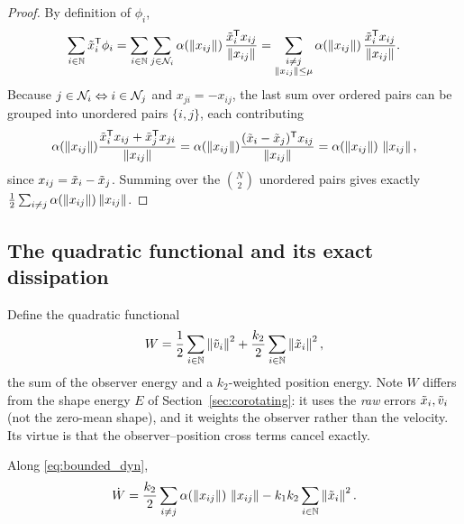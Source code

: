 \begin{proof}
By definition of $\phi_i$,
\begin{equation}
  \sum_{i\in\mathbb{N}}\tilde{x}_i^{\mathsf T}\phi_i
  =\sum_{i\in\mathbb{N}}\sum_{j\in\mathcal{N}_i}\alpha(\left\| x_{ij} \right\|)\,
    \frac{\tilde{x}_i^{\mathsf T}x_{ij}}{\left\| x_{ij} \right\|}
  =\sum_{\substack{i\ne j\\ \left\| x_{ij} \right\|\le\mu}}
    \alpha(\left\| x_{ij} \right\|)\,\frac{\tilde{x}_i^{\mathsf T}x_{ij}}{\left\| x_{ij} \right\|} .
\end{equation}
Because $j\in\mathcal{N}_i\Leftrightarrow i\in\mathcal{N}_j$ and $x_{ji}=-x_{ij}$, the last sum over ordered
pairs can be grouped into unordered pairs $\{i,j\}$, each contributing
\begin{equation}
  \alpha(\left\| x_{ij} \right\|)\frac{\tilde{x}_i^{\mathsf T}x_{ij}+\tilde{x}_j^{\mathsf T}x_{ji}}{\left\| x_{ij} \right\|}
  =\alpha(\left\| x_{ij} \right\|)\frac{(\tilde{x}_i-\tilde{x}_j)^{\mathsf T}x_{ij}}{\left\| x_{ij} \right\|}
  =\alpha(\left\| x_{ij} \right\|)\,\left\| x_{ij} \right\| ,
\end{equation}
since $x_{ij}=\tilde{x}_i-\tilde{x}_j$. Summing over the $\binom{N}{2}$ unordered pairs gives exactly
$\frac12\sum_{i\ne j}\alpha(\left\| x_{ij} \right\|)\left\| x_{ij} \right\|$.
\end{proof}

\subsection{The quadratic functional and its exact dissipation}
\label{sec:W}

Define the quadratic functional
\begin{equation}
  W=\frac12\sum_{i\in\mathbb{N}}\left\| \tilde{v}_i \right\|^2+\frac{k_2}{2}\sum_{i\in\mathbb{N}}\left\| \tilde{x}_i \right\|^2 ,
  \label{eq:W}
\end{equation}
the sum of the observer energy and a $k_2$-weighted position energy. Note $W$ differs from the shape
energy $E$ of Section~\ref{sec:corotating}: it uses the \emph{raw} errors $\tilde{x}_i,\tilde{v}_i$ (not the
zero-mean shape), and it weights the observer rather than the velocity. Its virtue is that the
observer--position cross terms cancel exactly.

\begin{lemma}\label{lem:Wd}
Along \eqref{eq:bounded_dyn},
\begin{equation}
  \dot W=\frac{k_2}{2}\sum_{i\ne j}\alpha(\left\| x_{ij} \right\|)\,\left\| x_{ij} \right\|
         -k_1k_2\sum_{i\in\mathbb{N}}\left\| \tilde{x}_i \right\|^2 .
  \label{eq:Wd}
\end{equation}
\end{lemma}

